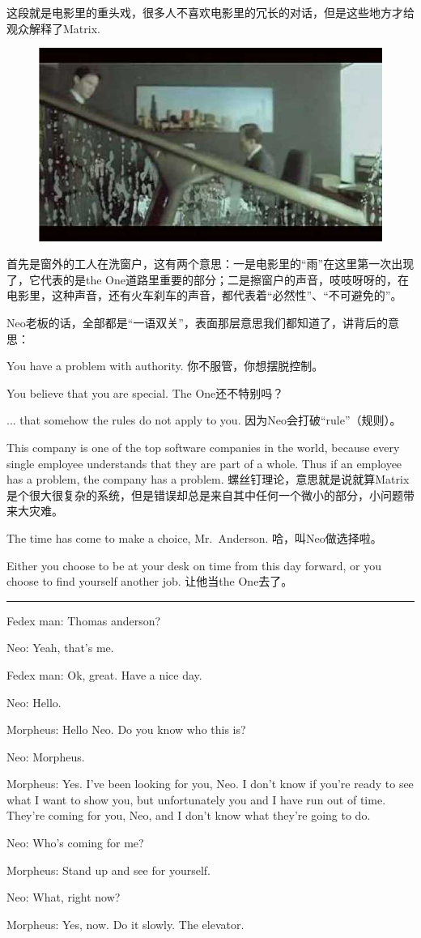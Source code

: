 \documentclass{ctexart}
\newcommand{\myparsep}{\noindent \rule[0.5ex]{\linewidth}{1pt}}
\newenvironment{myquote}{\color{green} \setlength{\leftskip}{6em} \setlength{\rightskip}{4em} \setlength{\parindent}{-2em}}{\par}
\begin{document}
这段就是电影里的重头戏，很多人不喜欢电影里的冗长的对话，但是这些地方才给观众解释了Matrix.

\begin{figure}[htb]
\centering
\includegraphics[width=0.5\linewidth]{fig/read_Matrix-7}
\end{figure}

首先是窗外的工人在洗窗户，这有两个意思：一是电影里的“雨”在这里第一次出现了，它代表的是the One道路里重要的部分；二是擦窗户的声音，吱吱呀呀的，在电影里，这种声音，还有火车刹车的声音，都代表着“必然性”、“不可避免的”。

Neo老板的话，全部都是“一语双关”，表面那层意思我们都知道了，讲背后的意思：

You have a problem with authority. 你不服管，你想摆脱控制。

You believe that you are special. The One还不特别吗？

... that somehow the rules do not apply to you. 因为Neo会打破“rule”（规则）。

This company is one of the top software companies in the world, because every single employee understands that they are part of a whole. Thus if an employee has a problem, the company has a problem. 螺丝钉理论，意思就是说就算Matrix是个很大很复杂的系统，但是错误却总是来自其中任何一个微小的部分，小问题带来大灾难。

The time has come to make a choice, Mr.~Anderson. 哈，叫Neo做选择啦。

Either you choose to be at your desk on time from this day forward, or you choose to find yourself another job. 让他当the One去了。

\myparsep

\begin{myquote}
Fedex man: Thomas anderson?

Neo: Yeah, that's me.

Fedex man: Ok, great. Have a nice day.

Neo: Hello.

Morpheus: Hello Neo. Do you know who this is?

Neo: Morpheus.

Morpheus: Yes. I've been looking for you, Neo. I don't know if you're ready to see what I want to show you, but unfortunately you and I have run out of time. They're coming for you, Neo, and I don't know what they're going to do.

Neo: Who's coming for me?

Morpheus: Stand up and see for yourself.

Neo: What, right now?

Morpheus: Yes, now. Do it slowly. The elevator.
\end{myquote}
\end{document}
